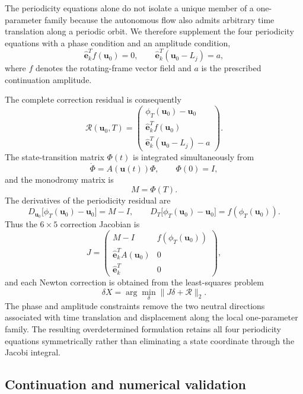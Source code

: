 The periodicity equations alone do not isolate a unique member of a
one-parameter family because the autonomous flow also admits arbitrary
time translation along a periodic orbit. We therefore supplement the four
periodicity equations with a phase condition and an amplitude condition,
\begin{equation}
\widehat{\mathbf e}_k^T f(\mathbf u_0)=0,
\qquad
\widehat{\mathbf e}_k^T(\mathbf u_0-L_j)=a,
\label{eq:phase_amplitude_conditions}
\end{equation}
where $f$ denotes the rotating-frame vector field and $a$ is the prescribed
continuation amplitude.

The complete correction residual is consequently
\begin{equation}
\mathcal R(\mathbf u_0,T)=
\begin{pmatrix}
\phi_T(\mathbf u_0)-\mathbf u_0\\
\widehat{\mathbf e}_k^T f(\mathbf u_0)\\
\widehat{\mathbf e}_k^T(\mathbf u_0-L_j)-a
\end{pmatrix}.
\label{eq:shooting_residual}
\end{equation}
The state-transition matrix $\Phi(t)$ is integrated simultaneously from
\[
\dot{\Phi}=A(\mathbf u(t))\Phi,
\qquad
\Phi(0)=I,
\]
and the monodromy matrix is
\[
M=\Phi(T).
\]
The derivatives of the periodicity residual are
\[
D_{\mathbf u_0}
\bigl[\phi_T(\mathbf u_0)-\mathbf u_0\bigr]
=
M-I,
\qquad
D_T
\bigl[\phi_T(\mathbf u_0)-\mathbf u_0\bigr]
=
f(\phi_T(\mathbf u_0)).
\]
Thus the $6\times5$ correction Jacobian is
\begin{equation}
J=
\begin{pmatrix}
M-I & f(\phi_T(\mathbf u_0))\\
\widehat{\mathbf e}_k^T A(\mathbf u_0) & 0\\
\widehat{\mathbf e}_k^T & 0
\end{pmatrix},
\label{eq:shooting_jacobian}
\end{equation}
and each Newton correction is obtained from the least-squares problem
\[
\delta X
=
\arg\min_{\delta}
\|J\delta+\mathcal R\|_2.
\]
The phase and amplitude constraints remove the two neutral directions
associated with time translation and displacement along the local
one-parameter family. The resulting overdetermined formulation retains all
four periodicity equations symmetrically rather than eliminating a state
coordinate through the Jacobi integral.


\subsection{Continuation and numerical validation}
\label{subsec:periodic_continuation}

